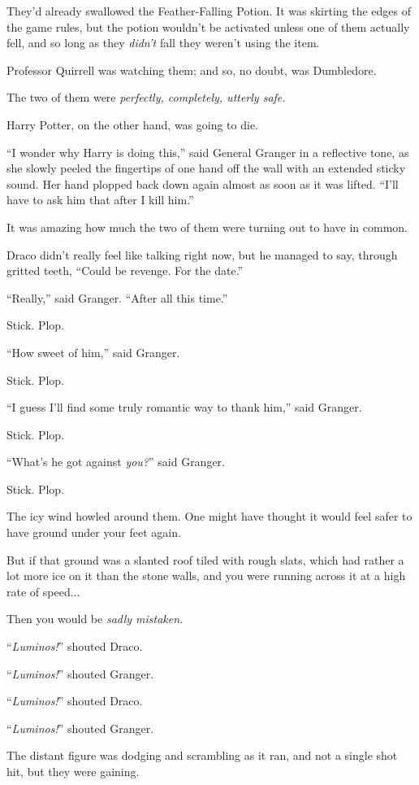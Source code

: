 They’d already swallowed the Feather-Falling Potion. It was skirting the edges of the game rules, but the potion wouldn’t be activated unless one of them actually fell, and so long as they \emph{didn’t} fall they weren’t using the item.

Professor Quirrell was watching them; and so, no doubt, was Dumbledore.

The two of them were \emph{perfectly, completely, utterly safe.}

Harry Potter, on the other hand, was going to die.

“I wonder why Harry is doing this,” said General Granger in a reflective tone, as she slowly peeled the fingertips of one hand off the wall with an extended sticky sound. Her hand plopped back down again almost as soon as it was lifted. “I’ll have to ask him that after I kill him.”

It was amazing how much the two of them were turning out to have in common.

Draco didn’t really feel like talking right now, but he managed to say, through gritted teeth, “Could be revenge. For the date.”

“Really,” said Granger. “After all this time.”

Stick. Plop.

“How sweet of him,” said Granger.

Stick. Plop.

“I guess I’ll find some truly romantic way to thank him,” said Granger.

Stick. Plop.

“What’s he got against \emph{you?}” said Granger.

Stick. Plop.

The icy wind howled around them.
\sbreak
One might have thought it would feel safer to have ground under your feet again.

But if that ground was a slanted roof tiled with rough slats, which had rather a lot more ice on it than the stone walls, and you were running across it at a high rate of speed...

Then you would be \emph{sadly mistaken.}

“\emph{Luminos!}” shouted Draco.

“\emph{Luminos!}” shouted Granger.

“\emph{Luminos!}” shouted Draco.

“\emph{Luminos!}” shouted Granger.

The distant figure was dodging and scrambling as it ran, and not a single shot hit, but they were gaining.

